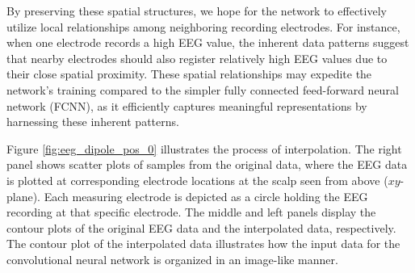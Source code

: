 \documentclass[a4paper, UKenglish, 11pt]{uiomaster}
\begin{document}
By preserving these spatial structures, we hope for the network to effectively utilize local relationships among neighboring recording electrodes. For instance, when one electrode records a high EEG value, the inherent data patterns suggest that nearby electrodes should also register relatively high EEG values due to their close spatial proximity. These spatial relationships may expedite the network's training compared to the simpler fully connected feed-forward neural network (FCNN), as it efficiently captures meaningful representations by harnessing these inherent patterns.

Figure \ref{fig:eeg_dipole_pos_0} illustrates the process of interpolation. The right panel shows scatter plots of samples from the original data, where the EEG data is plotted at corresponding electrode locations at the scalp seen from above ($xy$-plane). Each measuring electrode is depicted as a circle holding the EEG recording at that specific electrode. The middle and left panels display the contour plots of the original EEG data and the interpolated data, respectively. The contour plot of the interpolated data illustrates how the input data for the convolutional neural network is organized in an image-like manner.
\end{document}
